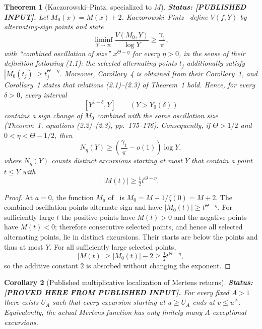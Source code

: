 \documentclass[11pt]{amsart}
\numberwithin{equation}{section}
\theoremstyle{plain}
\newtheorem{theorem}{Theorem}[section]
\newtheorem{corollary}[theorem]{Corollary}
\theoremstyle{definition}
\theoremstyle{remark}
\begin{document}
\begin{theorem}[Kaczorowski--Pintz, specialized to $M$]
\label{thm:KP-M}
\textbf{Status: [PUBLISHED INPUT].} Let $M_0(x)=M(x)+2$.
Kaczorowski--Pintz~\cite[Corollary~4, p.~178, equations (2.13)--(2.15)]{KP86}
define $V(f,Y)$ by alternating-sign points and state
\begin{equation}
\label{eq:KP-signchanges}
\liminf_{Y\to\infty}\frac{V(M_0,Y)}{\log Y}
\ge\frac{\gamma_1}{\pi},
\end{equation}
with ``combined oscillation of size'' $x^{\Theta-\eta}$ for every $\eta>0$,
in the sense of their definition following (1.1): the selected alternating
points $t_j$ additionally satisfy $|M_0(t_j)|\ge t_j^{\Theta-\eta}$.
Moreover, Corollary~4 is obtained from their Corollary~1, and
Corollary~1 states that relations (2.1)--(2.3) of Theorem~1 hold. Hence, for
every $\delta>0$, every interval
\[
[Y^{1-\delta},Y]\qquad(Y>Y_0(\delta))
\]
contains a sign change of $M_0$ combined with the same oscillation size
(Theorem~1, equations (2.2)--(2.3), pp.~175--176).
Consequently, if $\Theta>1/2$ and $0<\eta<\Theta-1/2$, then
\begin{equation}
\label{eq:KP-large-excursions}
N_\eta(Y)\ge\left(\frac{\gamma_1}{\pi}-o(1)\right)\log Y,
\end{equation}
where $N_\eta(Y)$ counts distinct excursions starting at most $Y$ that
contain a point $t\le Y$ with
\[
|M(t)|\ge\tfrac12 t^{\Theta-\eta}.
\]
\end{theorem}

\begin{proof}
At $a=0$, the function $M_a$ of~\cite{KP86} is
$M_0=M-1/\zeta(0)=M+2$. The combined oscillation points alternate sign and
have $|M_0(t)|\ge t^{\Theta-\eta}$. For sufficiently large $t$ the positive
points have $M(t)>0$ and the negative points have $M(t)<0$; therefore
consecutive selected points, and hence all selected alternating points, lie
in distinct excursions. Their starts are below the points and thus at most
$Y$. For all sufficiently large selected points,
\[
|M(t)|\ge |M_0(t)|-2\ge \tfrac12 t^{\Theta-\eta},
\]
so the additive constant $2$ is absorbed without changing the exponent.
\end{proof}

\begin{corollary}[Published multiplicative localization of Mertens returns]
\label{cor:KP-local-returns}
\textbf{Status: [PROVED HERE FROM PUBLISHED INPUT].} For every fixed $A>1$
there exists $U_A$ such that every excursion starting at $u\ge U_A$ ends at
$v\le u^A$. Equivalently, the actual Mertens function has only finitely many
$A$-exceptional excursions.
\end{corollary}
\end{document}
